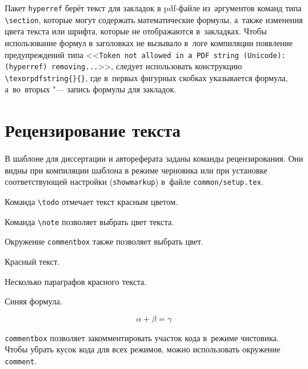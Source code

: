 Пакет \texttt{hyperref} берёт текст для закладок в pdf-файле из~аргументов
команд типа \verb|\section|, которые могут содержать математические формулы,
а~также изменения цвета текста или шрифта, которые не отображаются в~закладках.
Чтобы использование формул в заголовках не вызывало в~логе компиляции появление
предупреждений типа <<\texttt{Token not allowed in~a~PDF string
    (Unicode):(hyperref) removing...}>>, следует использовать конструкцию
\verb|\texorpdfstring{}{}|, где в~первых фигурных скобках указывается
формула, а~во~вторых "--- запись формулы для закладок.

\section{Рецензирование текста}\label{sec:markup}

В шаблоне для диссертации и автореферата заданы команды рецензирования.
Они видны при компиляции шаблона в режиме черновика или при установке
соответствующей настройки (\verb+showmarkup+) в~файле \verb+common/setup.tex+.

Команда \verb+\todo+ отмечает текст красным цветом.

Команда \verb+\note+ позволяет выбрать цвет текста.
  
 

Окружение \verb+commentbox+ также позволяет выбрать цвет.

\begin{commentbox}[red]
    Красный текст.

    Несколько параграфов красного текста.
\end{commentbox}

\begin{commentbox}[blue]
    Синяя формула.

    \begin{equation}
        \alpha + \beta = \gamma
    \end{equation}
\end{commentbox}

\verb+commentbox+ позволяет закомментировать участок кода в~режиме чистовика.
Чтобы убрать кусок кода для всех режимов, можно использовать окружение
\verb+comment+.

